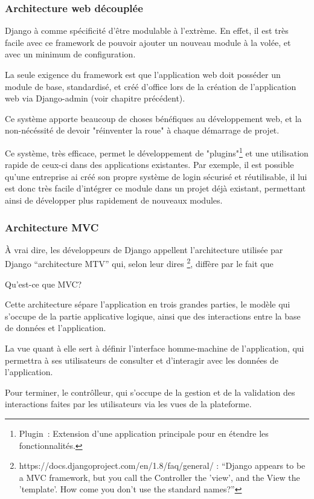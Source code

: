 \documentclass[12pt,table,a4paper]{report}
\begin{document}
\subsubsection{Architecture web découplée}
Django à comme spécificité d'être modulable à l'extrème. En effet, il est très facile avec ce framework de pouvoir ajouter un nouveau module à la volée, et avec un minimum de configuration.

La seule exigence du framework est que l'application web doit posséder un module de base, standardisé, et créé d'office lors de la création de l'application web via Django-admin (voir chapitre précédent).

Ce système apporte beaucoup de choses bénéfiques au développement web, et la non-nécéssité de devoir "réinventer la roue" à chaque démarrage de projet.

Ce système, très efficace, permet le développement de "plugins"\footnote{Plugin : Extension d'une application principale pour en étendre les fonctionnalités.} et une utilisation rapide de ceux-ci dans des applications existantes.
Par exemple, il est possible qu'une entreprise ai créé son propre système de login sécurisé et réutilisable, il lui est donc très facile d'intégrer ce module dans un projet déjà existant, permettant ainsi de développer plus rapidement de nouveaux modules.

\subsubsection{Architecture MVC}
À vrai dire, les développeurs de Django appellent l'architecture utilisée par Django "`architecture MTV"' qui, selon leur dires \footnote{https://docs.djangoproject.com/en/1.8/faq/general/ : "`Django appears to be a MVC framework, but you call the Controller the 'view', and the View the 'template'. How come you don’t use the standard names?"'}, diffère par le fait que 

Qu'est-ce que MVC?

Cette architecture sépare l'application en trois grandes parties, le modèle qui s'occupe de la partie applicative logique, ainsi que des interactions entre la base de données et l'application.

La vue quant à elle sert à définir l'interface homme-machine de l'application, qui permettra à ses utilisateurs de consulter et d'interagir avec les données de l'application.

Pour terminer, le contrôlleur, qui s'occupe de la gestion et de la validation des interactions faites par les utilisateurs via les vues de la plateforme.
\end{document}
